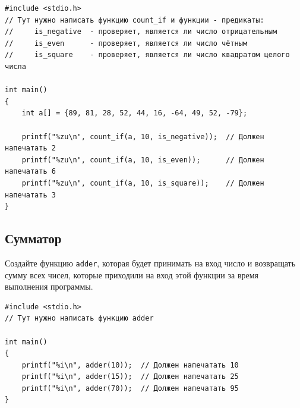\documentclass{article}
\begin{document}
\begin{lstlisting}
#include <stdio.h>
// Тут нужно написать функцию count_if и функции - предикаты:
//     is_negative  - проверяет, является ли число отрицательным
//     is_even      - проверяет, является ли число чётным
//     is_square    - проверяет, является ли число квадратом целого числа

int main()
{
    int a[] = {89, 81, 28, 52, 44, 16, -64, 49, 52, -79};
    
    printf("%zu\n", count_if(a, 10, is_negative));  // Должен напечатать 2
    printf("%zu\n", count_if(a, 10, is_even));      // Должен напечатать 6
    printf("%zu\n", count_if(a, 10, is_square));    // Должен напечатать 3
}

\end{lstlisting}

\subsection{Сумматор}
Создайте функцию \texttt{adder}, которая будет принимать на вход число и возвращать сумму всех чисел, которые приходили на вход этой функции за время выполнения программы.
\begin{lstlisting}
#include <stdio.h>
// Тут нужно написать функцию adder

int main()
{
    printf("%i\n", adder(10));  // Должен напечатать 10
    printf("%i\n", adder(15));  // Должен напечатать 25
    printf("%i\n", adder(70));  // Должен напечатать 95
}
\end{lstlisting}
\end{document}
